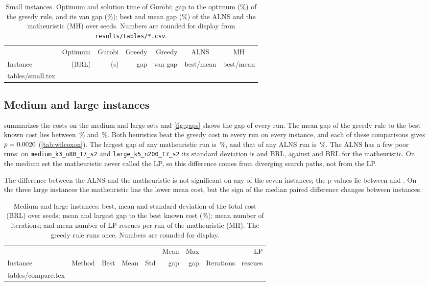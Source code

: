 \documentclass[11pt,a4paper]{article}
\makeatletter
\newcommand{\tablebody}[1]{\@@input tables/#1.tex }
\makeatother
\begin{document}
\begin{table}[!tbp]
\centering\footnotesize\setlength{\tabcolsep}{4pt}
\caption{Small instances. Optimum and solution time of Gurobi; gap to the optimum (\%) of the
greedy rule, and its van gap (\%); best and mean gap (\%) of the ALNS and the matheuristic (MH)
over \nSeeds{} seeds. Numbers are rounded for display from \texttt{results/tables/*.csv}.}
\label{tab:small}
\begin{tabular}{lrrrrcc}
\toprule
& Optimum & Gurobi & Greedy & Greedy & ALNS & MH \\
Instance & (BRL) & (s) & gap & van gap & best/mean & best/mean \\
\midrule
\tablebody{small}
\bottomrule
\end{tabular}
\end{table}

\subsection{Medium and large instances}
 summarizes the costs on the medium and large sets and \cref{fig:gaps} shows the
gap of every run. The mean gap of the greedy rule to the best known cost lies between
\greedyMinGapCompare{}\,\% and \greedyMaxGapCompare{}\,\%. Both heuristics beat the greedy cost in
every run on every instance, and each of these comparisons gives $p = 0.0020$
(\cref{tab:wilcoxon}). The largest gap of any matheuristic run is \mhMaxGapCompare{}\,\%, and that
of any ALNS run is \alnsMaxGapCompare{}\,\%. The ALNS has a few poor runs: on
\texttt{medium\_k3\_n80\_T7\_s2} and \texttt{large\_k5\_n200\_T7\_s2} its standard deviation is
\stdAlnsMedium{} and \stdAlnsLarge{} BRL, against \stdMhMedium{} and \stdMhLarge{} BRL for the
matheuristic. On the medium set the matheuristic never called the LP, so this difference comes from diverging
search paths, not from the LP.

The difference between the ALNS and the matheuristic is not significant on any of the seven
instances; the p-values lie between \pEachMin{} and \pEachMax{}. On the three large instances the
matheuristic has the lower mean cost, but the sign of the median paired difference changes between
instances.

\begin{table}[!tbp]
\centering\footnotesize\setlength{\tabcolsep}{4pt}
\caption{Medium and large instances: best, mean and standard deviation of the total cost (BRL) over
\nSeeds{} seeds; mean and largest gap to the best known cost (\%); mean number of iterations; and
mean number of LP rescues per run of the matheuristic (MH). The greedy rule runs once. Numbers are
rounded for display.}
\label{tab:compare}
\begin{tabular}{llrrrrrrr}
\toprule
& & & & & Mean & Max & & LP \\
Instance & Method & Best & Mean & Std & gap & gap & Iterations & rescues \\
\midrule
\tablebody{compare}
\bottomrule
\end{tabular}
\end{table}
\end{document}
